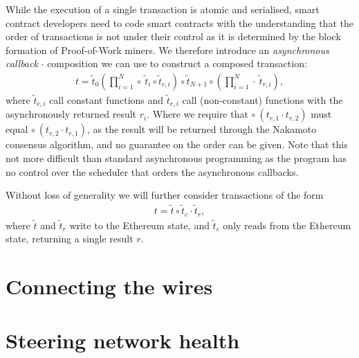 \documentclass[twocolumn]{article}
\begin{document}
While the execution of a single transaction is atomic and serialised, smart contract developers need to code smart contracts with the understanding that the order of transactions is not under their control as it is determined by the block formation of Proof-of-Work miners.  We therefore introduce an \textit{asynchronous callback} $\cdot$ composition we can use to construct a composed transaction:
\begin{align}
	t = \tilde{t}_0 \left(\prod_{i=1}^{N} \circ \ \tilde{t}_i \circ \tilde{t}_{c, i} \right) \circ \tilde{t}_{N+1} \circ \left(\prod_{i=1}^N \cdot \ \tilde{t}_{r, i}\right),
\end{align}
where $\tilde{t}_{c, i}$ call constant functions and $\tilde{t}_{r, i}$ call (non-constant) functions with the asynchronously returned result $r_i$.  Where we require that $\circ \ ( t_{r, 1} \cdot t_{r, 2} )$ must equal $\circ \ ( t_{r, 2} \cdot t_{r, 1} )$, as the result will be returned through the Nakamoto consensus algorithm, and no guarantee on the order can be given.  Note that this not more difficult than standard asynchronous programming as the program has no control over the scheduler that orders the asynchronous callbacks.

Without loss of generality we will further consider transactions of the form
\begin{align}
	t = \tilde{t} \circ \tilde{t}_c \cdot \tilde{t}_r,
\end{align}
where $\tilde{t}$ and $\tilde{t}_r$ write to the Ethereum state, and $\tilde{t}_c$ only reads from the Ethereum state, returning a single result $r$.
\section{Connecting the wires}
\section{Steering network health}

\end{document}
